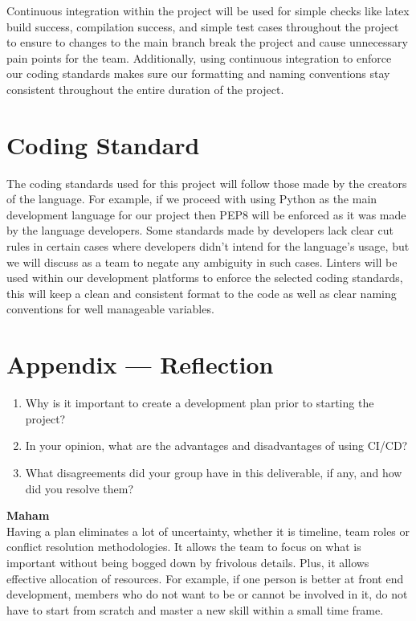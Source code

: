 \documentclass{article}
\begin{document}
Continuous integration within the project will be used for simple checks like latex build success, compilation success, and simple test cases throughout the project to ensure to changes to the main branch break the project and cause unnecessary pain points for the team. Additionally, using continuous integration to enforce our coding standards makes sure our formatting and naming conventions stay consistent throughout the entire duration of the project.

\section{Coding Standard}

The coding standards used for this project will follow those made by the creators of the language. For example, if we proceed with using Python as the main development language for our project then PEP8 will be enforced as it was made by the language developers. Some standards made by developers lack clear cut rules in certain cases where developers didn’t intend for the language’s usage, but we will discuss as a team to negate any ambiguity in such cases.
Linters will be used within our development platforms to enforce the selected coding standards, this will keep a clean and consistent format to the code as well as clear naming conventions for well manageable variables.

\newpage{}

\section*{Appendix --- Reflection}



\begin{enumerate}
    \item Why is it important to create a development plan prior to starting the
    project?
    \item In your opinion, what are the advantages and disadvantages of using
    CI/CD?
    \item What disagreements did your group have in this deliverable, if any,
    and how did you resolve them?
\end{enumerate}
\textbf{Maham} \\
Having a plan eliminates a lot of uncertainty, whether it is timeline, team roles or conflict resolution methodologies. It allows the team to focus on what is important without being bogged down by frivolous details. Plus, it allows effective allocation of resources. For example, if one person is better at front end development, members who do not want to be or cannot be involved in it, do not have to start from scratch and master a new skill within a small time frame. 
\end{document}
